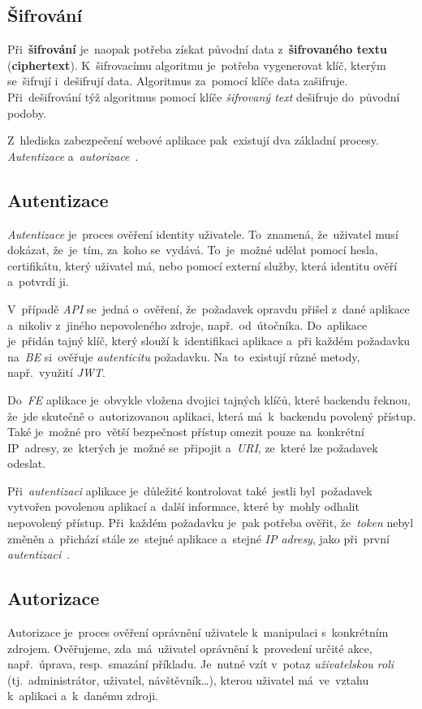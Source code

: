 \documentclass[11pt,a4paper]{report}
\let\oldacrshort\acrshort
\renewcommand{\acrshort}[1]{\emph{\normalsize\color[rgb]{0,0,0}\noindent\oldacrshort{#1}}}
\begin{document}
            \subsection{Šifrování}
                Při~\textbf{šifrování} je~naopak potřeba získat původní data z~\textbf{šifrovaného textu} (\textbf{ciphertext}). K~šifrovacímu algoritmu je~potřeba vygenerovat klíč, kterým se~šifrují i~dešifrují data. Algoritmus za~pomocí klíče data zašifruje. Při~dešifrování týž algoritmus pomocí klíče \emph{šifrovaný text} dešifruje do~původní podoby.

                Z~hlediska zabezpečení webové aplikace pak~existují dva základní procesy. \emph{Autentizace} a~\emph{autorizace}~\cite{graham2021ethical}.

            \subsection{Autentizace}
                \emph{Autentizace} je~proces ověření identity uživatele. To~znamená, že~uživatel musí dokázat, že~je~tím, za~koho se~vydává. To~je~možné udělat pomocí hesla, certifikátu, který uživatel má, nebo pomocí externí služby, která identitu ověří a~potvrdí ji.
                
                V~případě \acrshort{API} se~jedná o~ověření, že~požadavek opravdu přišel z~dané aplikace a~nikoliv z~jiného nepovoleného zdroje, např.~od~útočníka. Do~aplikace je~přidán tajný klíč, který slouží k~identifikaci aplikace a~při každém požadavku na~\acrshort{BE} si~ověřuje \emph{autenticitu} požadavku. Na~to~existují různé metody, např.~využití \acrshort{JWT}.
                
                Do~\acrshort{FE} aplikace je~obvykle vložena dvojici tajných klíčů, které backendu řeknou, že~jde skutečně o~autorizovanou aplikaci, která má~k~backendu povolený přístup. Také je~možné pro~větší bezpečnost přístup omezit pouze na~konkrétní IP~adresy, ze~kterých je~možné se~připojit a~\acrshort{URI}, ze~které lze požadavek odeslat.

                Při~\emph{autentizaci} aplikace je~důležité kontrolovat také~jestli byl~požadavek vytvořen povolenou aplikací a~další informace, které by~mohly odhalit nepovolený přístup. Při~každém požadavku je~pak potřeba ověřit, že~\emph{token} nebyl změněn a~přichází stále ze~stejné aplikace a~stejné \emph{IP adresy}, jako při~první \emph{autentizaci}~\cite{graham2021ethical}.
            
            \subsection{Autorizace}
                Autorizace je~proces ověření oprávnění uživatele k~manipulaci s~konkrétním zdrojem. Ověřujeme, zda~má~uživatel oprávnění k~provedení určité akce, např.~úprava, resp.~smazání příkladu. Je~nutné vzít v~potaz \emph{uživatelskou roli} (tj.~administrátor, uživatel, návštěvník\dots), kterou uživatel má~ve~vztahu k~aplikaci a~k~danému zdroji.
                
\end{document}
